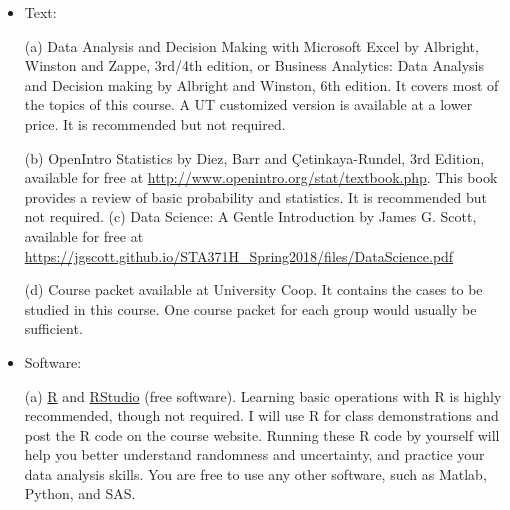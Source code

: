 \documentclass[11pt]{article}
\begin{document}
\begin{itemize}
\item Text:  


(a) Data Analysis and Decision Making with Microsoft Excel by Albright, Winston and Zappe, 3rd/4th edition, or Business Analytics: Data Analysis and Decision making by Albright and Winston, 6th edition. It covers most of the topics  of this course. A UT customized version is available at a lower price.       It is recommended but not required. 

(b) OpenIntro Statistics by Diez, Barr and \c{C}etinkaya-Rundel, 3rd Edition, available for free at \href{https://www.openintro.org/stat/textbook.php?stat_book=os}{\textcolor[rgb]{0.00,0.00,1.00}{http://www.openintro.org/stat/textbook.php}}. %
This book provides a
 review of basic probability and statistics.  It is recommended but not required.
(c) Data Science: A Gentle Introduction by James G. Scott, available for free at \href{https://jgscott.github.io/STA371H_Spring2018/files/DataScience.pdf}{\textcolor[rgb]{0.00,0.00,1.00}{https://jgscott.github.io/STA371H\_Spring2018/files/DataScience.pdf}}

(d) Course packet available at University Coop. It contains the cases to be studied in this course. One course packet for each group would usually be sufficient. %

	
	
\item Software:  

(a) 
 \href{https://cran.rstudio.com/}{\textcolor[rgb]{0.00,0.00,1.00}{
R}} and  \href{https://www.rstudio.com/products/rstudio/download/}{\textcolor[rgb]{0.00,0.00,1.00}{
RStudio}}  (free software). Learning basic operations with R is highly recommended, though not required. I will use R for class demonstrations and post the R code on the course website.  Running these R code by yourself will help you better understand randomness and uncertainty, and practice your data analysis skills. %
You are free to use any other software, such as Matlab, Python, and SAS. %
		

\end{itemize}
\end{document}
